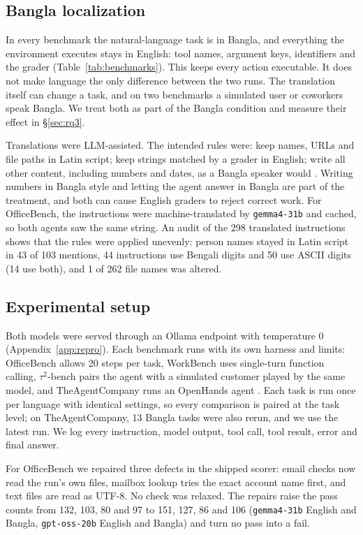 \documentclass[11pt]{article}
\newif\ifshowverify
\newcommand{\verify}[1]{\ifshowverify{\color{red}\,[VERIFY: #1]}\fi}
\newcommand{\gemma}{\texttt{gemma4-31b}}
\newcommand{\gptoss}{\texttt{gpt-oss-20b}}
\newcommand{\OB}{OfficeBench}
\newcommand{\WB}{WorkBench}
\newcommand{\TAU}{$\tau^2$-bench}
\newcommand{\TAC}{TheAgentCompany}
\begin{document}
\subsection{Bangla localization}
\label{sec:localization}
In every benchmark the natural-language task is in Bangla, and everything the environment
executes stays in English: tool names, argument keys, identifiers and the grader
(Table~\ref{tab:benchmarks}). This keeps every action executable. It does not make language the
only difference between the two runs. The translation itself can change a task, and on two
benchmarks a simulated user or coworkers speak Bangla. We treat both as part of the Bangla
condition and measure their effect in \S\ref{sec:rq3}.

Translations were LLM-assisted. The intended rules were: keep names, URLs and file paths in Latin
script; keep strings matched by a grader in English; write all other content, including numbers
and dates, as a Bangla speaker would \verify{the draft states that an independent review checked
meaning; reviewer and coverage are not recorded}. Writing numbers in Bangla style and letting the
agent answer in Bangla are part of the treatment, and both can cause English graders to reject
correct work. For \OB{}, the instructions were machine-translated by \gemma{} and cached, so both
agents saw the same string. An audit of the 298 translated instructions shows that the rules were
applied unevenly: person names stayed in Latin script in 43 of 103 mentions, 44 instructions use
Bengali digits and 50 use ASCII digits (14 use both), and 1 of 262 file names was altered.

\subsection{Experimental setup}
Both models were served through an Ollama endpoint with temperature 0 (Appendix~\ref{app:repro}).
Each benchmark runs with its own harness and limits: \OB{} allows 20 steps per task, \WB{} uses
single-turn function calling, \TAU{} pairs the agent with a simulated customer played by the same
model, and \TAC{} runs an OpenHands agent \verify{100-iteration cap stated in the draft; not in
the sources}. Each task is run once per language with identical settings, so every comparison is
paired at the task level; on \TAC{}, 13 Bangla tasks were also rerun, and we use the latest run.
We log every instruction, model output, tool call, tool result, error and final answer.

For \OB{} we repaired three defects in the shipped scorer: email checks now read the run's own
files, mailbox lookup tries the exact account name first, and text files are read as UTF-8. No
check was relaxed. The repairs raise the pass counts from 132, 103, 80 and 97 to 151, 127, 86 and
106 (\gemma{} English and Bangla, \gptoss{} English and Bangla) and turn no pass into a fail.
\end{document}
